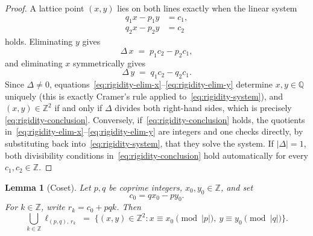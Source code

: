 \documentclass[a4paper,11pt,oneside,reqno]{amsart}
\theoremstyle{definition}
\theoremstyle{remark}
\theoremstyle{plain}
\newtheorem{lemma}[definition]{Lemma}
\newcommand{\Z}{\mathbb{Z}}
\begin{document}
\begin{proof}
  A lattice point \((x,y)\) lies on both lines exactly when the linear system
  \begin{equation}
    \label{eq:rigidity-system}
    \begin{aligned}
      q_1x - p_1y &= c_1, \\
      q_2x - p_2y &= c_2
    \end{aligned}
  \end{equation}
  holds. Eliminating \(y\) gives
  \begin{equation}
    \label{eq:rigidity-elim-x}
    \Delta\, x \;=\; p_1c_2 - p_2c_1,
  \end{equation}
  and eliminating \(x\) symmetrically gives
  \begin{equation}
    \label{eq:rigidity-elim-y}
    \Delta\, y \;=\; q_1c_2 - q_2c_1.
  \end{equation}
  Since \(\Delta\ne0\), equations~\eqref{eq:rigidity-elim-x}--\eqref{eq:rigidity-elim-y} determine
  \(x,y\in\mathbb Q\) uniquely (this is exactly Cramer's rule applied to~\eqref{eq:rigidity-system}),
  and \((x,y)\in\Z^2\) if and only if \(\Delta\) divides both right-hand sides, which is precisely
  \eqref{eq:rigidity-conclusion}. Conversely, if~\eqref{eq:rigidity-conclusion} holds, the
  quotients in~\eqref{eq:rigidity-elim-x}--\eqref{eq:rigidity-elim-y} are integers and one checks
  directly, by substituting back into~\eqref{eq:rigidity-system}, that they solve the system. If
  \(|\Delta|=1\), both
  divisibility conditions in~\eqref{eq:rigidity-conclusion} hold automatically for every
  \(c_1,c_2\in\Z\).
\end{proof}

\begin{lemma}[Coset]
  \label{lem:coset}
  Let \(p,q\) be coprime integers, \(x_0,y_0\in\Z\), and set
  \begin{equation}
    \label{eq:c0-def}
    c_0 = qx_0-py_0.
  \end{equation}
  For \(k\in\Z\), write \(r_k=c_0+pqk\). Then
  \begin{equation}
    \label{eq:coset-conclusion}
    \bigcup_{k\in\Z} \ell_{(p,q),\,r_k} \;=\; \{(x,y)\in\Z^2 : x\equiv x_0\!\!\pmod{|p|},\
    y\equiv y_0\!\!\pmod{|q|}\}.
  \end{equation}
\end{lemma}
\end{document}
